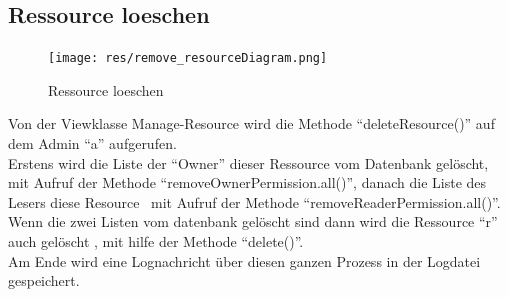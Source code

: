 \documentclass[parskip=full,11pt]{scrartcl}
\begin{document}
 
 
  \newpage
 \subsection{Ressource loeschen}
 \begin{figure}[ht!]
 	\centering
 	\texttt{[image: res/remove\_resourceDiagram.png]}
 	\caption{Ressource loeschen}
 \end{figure}
 
 
 Von der Viewklasse Manage-Resource wird die Methode \enquote{deleteResource()} auf dem Admin \enquote{a}  aufgerufen.\\ Erstens wird die Liste der \enquote{Owner} dieser Ressource vom Datenbank gelöscht, mit Aufruf der Methode \enquote{removeOwnerPermission.all()}, danach die Liste des Lesers diese Resource \ mit Aufruf der Methode \enquote{removeReaderPermission.all()}.\\
 Wenn die zwei Listen vom datenbank gelöscht sind dann wird die Ressource \enquote{r} auch gelöscht , mit hilfe der Methode \enquote{delete()}.\\ Am Ende wird eine Lognachricht über diesen ganzen Prozess  in der Logdatei gespeichert.\\
 
 
 \newpage
{}
\printglossary	
	
 
\end{document}
